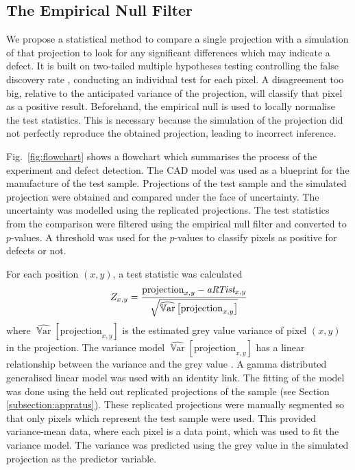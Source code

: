 \documentclass{article}
\DeclareMathOperator{\variance}{\mathbb{V}ar}
\begin{document}
\subsection{The Empirical Null Filter}
\label{subsection:empiricalnullfilter}

We propose a statistical method to compare a single projection with a simulation of that projection to look for any significant differences which may indicate a defect. It is built on two-tailed multiple hypotheses testing \citep{fisher1970statistical, neyman1933on, pearson1900on} controlling the false discovery rate \citep{benjamini2010discovering, benjamini1995controlling}, conducting an individual test for each pixel. A disagreement too big, relative to the anticipated variance of the projection, will classify that pixel as a positive result. Beforehand, the empirical null \citep{efron2004large} is used to locally normalise \citep{sage2018local, sage2003teaching} the test statistics. This is necessary because the simulation of the projection did not perfectly reproduce the obtained projection, leading to incorrect inference.

Fig.~\ref{fig:flowchart} shows a flowchart which summarises the process of the experiment and defect detection. The CAD model was used as a blueprint for the manufacture of the test sample. Projections of the test sample and the simulated projection were obtained and compared under the face of uncertainty. The uncertainty was modelled using the replicated projections. The test statistics from the comparison were filtered using the empirical null filter and converted to $p$-values. A threshold was used for the $p$-values to classify pixels as positive for defects or not.

For each position $(x,y)$, a test statistic was calculated
\begin{equation}
  Z_{x,y} = 
  \dfrac{
    \text{projection}_{x,y} - \emph{aRTist}_{x,y}
  }
  {
    \sqrt{\widehat{\variance}\left[\text{projection}_{x,y}\right]}
  }
\end{equation}
where $\widehat{\variance}\left[\text{projection}_{x,y}\right]$ is the estimated grey value variance of pixel $(x,y)$ in the projection. The variance model $\widehat{\variance}\left[\text{projection}_{x,y}\right]$ has a linear relationship between the variance and the grey value \citep{ma2012varaince, yang2010noise}. A gamma distributed generalised linear model \citep{mccullagh1984generalized, nelder1972generalized} was used with an identity link. The fitting of the model was done using the held out replicated projections of the sample (see Section \ref{subsection:appratus}). These replicated projections were manually segmented so that only pixels which represent the test sample were used. This provided variance-mean data, where each pixel is a data point, which was used to fit the variance model. The variance was predicted using the grey value in the simulated projection as the predictor variable.
\end{document}

